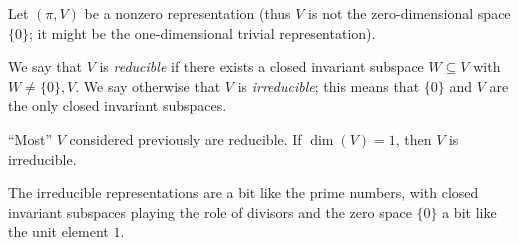 \documentclass[reqno]{amsart} 
\begin{document}
\begin{definition}
  Let $(\pi,V)$ be a nonzero representation (thus $V$ is not the zero-dimensional space $\{0\}$; it might be the one-dimensional trivial representation).

  We say that $V$ is \emph{reducible} if there exists a closed invariant subspace $W \subseteq V$ with $W \neq \{0\}, V$.  We say otherwise that $V$ is \emph{irreducible}; this means that $\{0\}$ and $V$ are the only closed invariant subspaces.
\end{definition}

\begin{example}
  ``Most'' $V$ considered previously are reducible.  If $\dim(V) = 1$, then $V$ is irreducible.
\end{example}
The irreducible representations are a bit like the prime numbers, with closed invariant subspaces playing the role of divisors and the zero space $\{0\}$ a bit like the unit element $1$.
\end{document}
